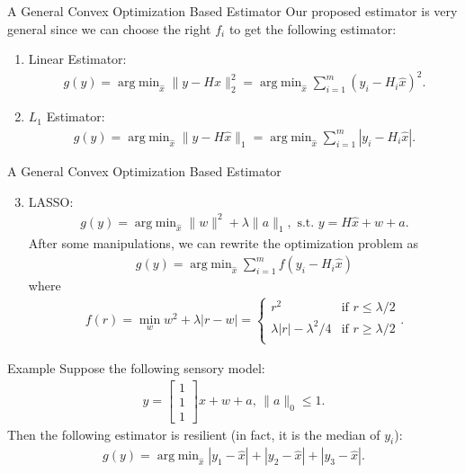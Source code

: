 \documentclass[10pt]{beamer}
\DeclareMathOperator{\argmin}{arg\;min}
\begin{document}
\begin{frame}{A General Convex Optimization Based Estimator}
  Our proposed estimator is very general since we can choose the right $f_i$ to get the following estimator:
  \begin{enumerate}
  \item Linear Estimator:
    \begin{align*}
      g(y) = \argmin_{\hat x} \|y-H\hat x\|_2^2= \argmin_{\hat x}  \sum_{i=1}^m (y_i-H_i\hat x)^2.
    \end{align*}
  \item $L_1$ Estimator:
    \begin{align*}
      g(y) = \argmin_{\hat x} \|y-H\hat x\|_1=\argmin_{\hat x} \sum_{i=1}^m |y_i-H_i\hat x|.
    \end{align*}
  \end{enumerate}
\end{frame}

\begin{frame}{A General Convex Optimization Based Estimator}
  \begin{enumerate}  \setcounter{enumi}{2}
  \item LASSO:
    \begin{align*}
      g(y) = \argmin_{\hat x} \|w\|^2+\lambda \|a\|_1, \text{ s.t. }y=H\hat x+w+a.
    \end{align*}
    After some manipulations, we can rewrite the optimization problem as
    \begin{align*}
      g(y) = \argmin_{\hat x} \sum_{i=1}^m f(y_i-H_i\hat x)
    \end{align*}
    where
    \begin{align*}
      f(r) = \min_{w} w^2 + \lambda |r-w| = \begin{cases}
        r^2 & \text{if } r \leq \lambda/2\\
        \lambda |r|-\lambda^2/4 & \text{if } r\geq \lambda/2\\
      \end{cases}.
    \end{align*}
  \end{enumerate}
\end{frame}

\begin{frame}{Example}
  Suppose the following sensory model:
  \begin{align*}
    y = \begin{bmatrix}
      1\\
      1\\
      1
    \end{bmatrix}x + w+a,\,\|a\|_0\leq 1.
  \end{align*}
  Then the following estimator is resilient (in fact, it is the median of $y_i$):
  \begin{align*}
    g(y) = \argmin_{\hat x}  |y_1-\hat x|+|y_2-\hat x|+|y_3-\hat x|.
  \end{align*}
\end{frame}
\end{document}
